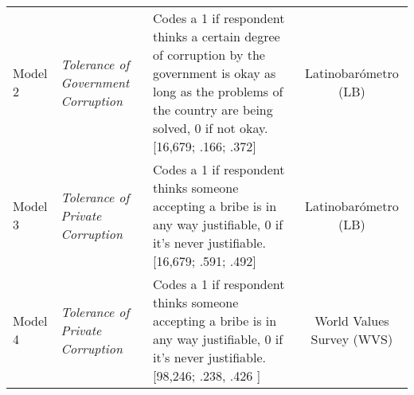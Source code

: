 \documentclass[11pt,]{article}
\begin{document}
\begin{longtable}[]{@{}lllc@{}}
\begin{minipage}[t]{0.10\columnwidth}\raggedright\strut
Model 2\strut
\end{minipage} & \begin{minipage}[t]{0.14\columnwidth}\raggedright\strut
\emph{Tolerance of Government Corruption}\strut
\end{minipage} & \begin{minipage}[t]{0.37\columnwidth}\raggedright\strut
Codes a 1 if respondent thinks a certain degree of corruption by the
government is okay as long as the problems of the country are being
solved, 0 if not okay. {[}16,679; .166; .372{]}\strut
\end{minipage} & \begin{minipage}[t]{0.21\columnwidth}\centering\strut
Latinobarómetro (LB)\strut
\end{minipage}\tabularnewline
\begin{minipage}[t]{0.10\columnwidth}\raggedright\strut
Model 3\strut
\end{minipage} & \begin{minipage}[t]{0.14\columnwidth}\raggedright\strut
\emph{Tolerance of Private Corruption}\strut
\end{minipage} & \begin{minipage}[t]{0.37\columnwidth}\raggedright\strut
Codes a 1 if respondent thinks someone accepting a bribe is in any way
justifiable, 0 if it's never justifiable. {[}16,679; .591; .492{]}\strut
\end{minipage} & \begin{minipage}[t]{0.21\columnwidth}\centering\strut
Latinobarómetro (LB)\strut
\end{minipage}\tabularnewline
\begin{minipage}[t]{0.10\columnwidth}\raggedright\strut
Model 4\strut
\end{minipage} & \begin{minipage}[t]{0.14\columnwidth}\raggedright\strut
\emph{Tolerance of Private Corruption}\strut
\end{minipage} & \begin{minipage}[t]{0.37\columnwidth}\raggedright\strut
Codes a 1 if respondent thinks someone accepting a bribe is in any way
justifiable, 0 if it's never justifiable. {[}98,246; .238, .426
{]}\strut
\end{minipage} & \begin{minipage}[t]{0.21\columnwidth}\centering\strut
World Values Survey (WVS)\strut
\end{minipage}\tabularnewline
\bottomrule
\end{longtable}
\end{document}
